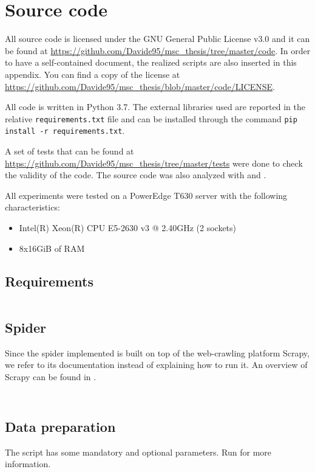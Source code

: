 \chapter{Source code}
All source code is licensed under the GNU General Public License v3.0 and it can be found at \url{https://github.com/Davide95/msc_thesis/tree/master/code}.
In order to have a self-contained document, the realized scripts are also inserted in this appendix.
You can find a copy of the license at \url{https://github.com/Davide95/msc_thesis/blob/master/code/LICENSE}.

All code is written in Python 3.7. The external libraries used are reported in the relative \texttt{requirements.txt} file and can be installed through the command \texttt{pip install -r requirements.txt}.

A set of tests that can be found at \url{https://github.com/Davide95/msc_thesis/tree/master/tests} were done to check the validity of the code.
The source code was also analyzed with  and .

All experiments were tested on a PowerEdge T630 server with the following characteristics:
\begin{itemize}
    \item Intel(R) Xeon(R) CPU E5-2630 v3 @ 2.40GHz (2 sockets)
    \item 8x16GiB of RAM
\end{itemize}

\section{Requirements}
\begin{minipage}{\linewidth}
    \inputminted{text}{../code/requirements.txt}
\end{minipage}

\pagebreak
\section{Spider} \label{spider}

Since the spider implemented is built on top of the web-crawling platform Scrapy, we refer to its documentation instead of explaining how to run it.
An overview of Scrapy can be found in \cite{kouzis2016learning}.

\inputminted{Python}{../code/custom_spider.py}

\inputminted{Python}{../code/custom_main_spider.py}

\pagebreak
\section{Data preparation} \label{preprocessing-code}
The script has some mandatory and optional parameters.
Run  for more information.

